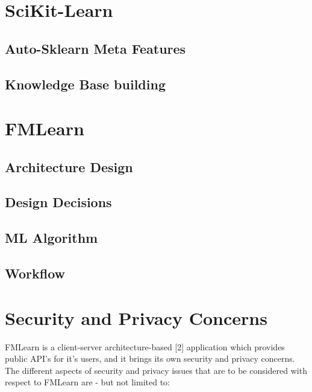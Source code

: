 \section{SciKit-Learn}
\label{scikit-learn}

\subsection{Auto-Sklearn Meta Features}
\label{auto-sklearn}

\subsection{Knowledge Base building}
\label{knowledge-base}

\section{FMLearn}
\label{fmlearn}

\subsection{Architecture Design}
\label{architecture}

\subsection{Design Decisions}
\label{design-decisioins}

\subsection{ML Algorithm}
\subsection{Workflow}

\section{Security and Privacy Concerns}
FMLearn is a client-server architecture-based [2] application which provides public API’s for it's users, and it brings its own security and privacy concerns. The different aspects of security and privacy issues that are to be considered with respect to FMLearn are - but not limited to:

